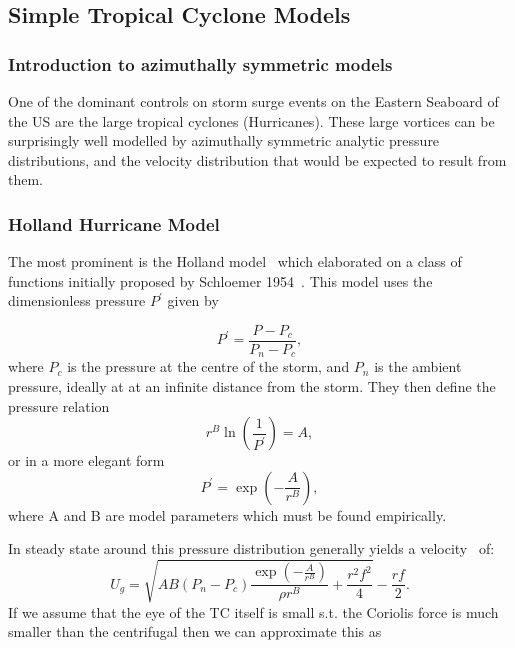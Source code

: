 \subsection{Simple Tropical Cyclone Models}

\subsubsection{Introduction to azimuthally symmetric models}
One of the dominant controls on storm surge events on the Eastern Seaboard
 of the US are the large tropical cyclones (Hurricanes).
  These large vortices can be surprisingly well modelled by azimuthally
   symmetric analytic pressure distributions, and the velocity distribution
    that would be expected to result from them.

\subsubsection{Holland Hurricane Model}
The most prominent is the  Holland model~\cite{holland1980analytic,holland2010revised}
 which elaborated on a class of functions initially proposed
 by Schloemer 1954~\cite{schloemer1954analysis}.
  This model uses the dimensionless pressure \( P^{\prime}\) given by

\begin{equation}
    P^{\prime}=\dfrac{P-P_{c}}{P_{n}-P_{c}},
\end{equation}
where $P_c$ is the pressure at the centre of the storm, and $P_n$ is
the ambient pressure, ideally at at an infinite distance from the storm.
They then define the pressure relation
\begin{equation}
    r^{B}\ln(\frac{1}{P^{\prime}})=A,
\end{equation}or in a more elegant form
\begin{equation}
P^{\prime}=\exp{(-\frac{A}{r^B})},
\end{equation}
where A and B are model parameters which must be found empirically.

In steady state around this  pressure distribution generally yields a
 velocity~\cite{roisin2010GFD} of:
\begin{equation}
    U_g = \sqrt{AB(P_{n} - P_{c})\frac{\exp{(-\frac{A}{r^{B}})}}{\rho r^{B}}
     +\frac{r^2f^2}{4}}-\frac{rf}{2}.
\end{equation}
If we assume that the eye of the TC itself is small s.t. the Coriolis force
 is much smaller than the centrifugal then we can approximate this as

